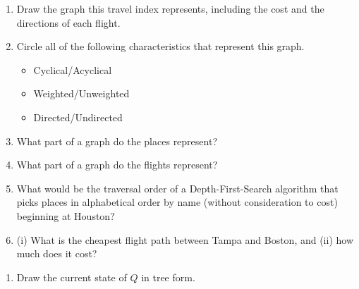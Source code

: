 \documentclass[11pt,addpoints]{exam}
\begin{document}
\begin{questions}
\begin{enumerate}[label=(\Alph*)]
  \item Draw the graph this travel index represents, including the cost and the directions of each flight.


\newpage

  \item Circle all of the following characteristics that represent this graph.

  \begin{itemize}
    \item Cyclical/Acyclical
    \item Weighted/Unweighted
    \item Directed/Undirected \\
  \end{itemize}

  \item What part of a graph do the places represent?


  \item What part of a graph do the flights represent?


  \item What would be the traversal order of a Depth-First-Search algorithm that picks places in alphabetical order by name (without consideration to cost) beginning at Houston?



  \item (i) What is the cheapest flight path between Tampa and Boston, and (ii) how much does it cost?



\end{enumerate}

\newpage


\begin{enumerate}[label=(\Alph*)]
  \item Draw the current state of $Q$ in tree form.


\end{enumerate}
\end{questions}
\end{document}
